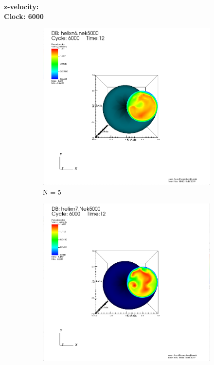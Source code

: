 \documentclass[12pt]{article}
\begin{document}
\noindent \textbf{z-velocity:}\\
\textbf{Clock: 6000}
\begin{figure}[h]
	\centering
	\begin{subfigure}[h]{0.400\textwidth}
		\centering
		\includegraphics[width=\textwidth]{z6c6000.png}
		\caption{N = 5}
	\end{subfigure}
	\begin{subfigure}[h]{0.400\textwidth}
		\centering
		\includegraphics[width=\textwidth]{z7c6000.png}

\end{subfigure}
\end{figure}
\end{document}
